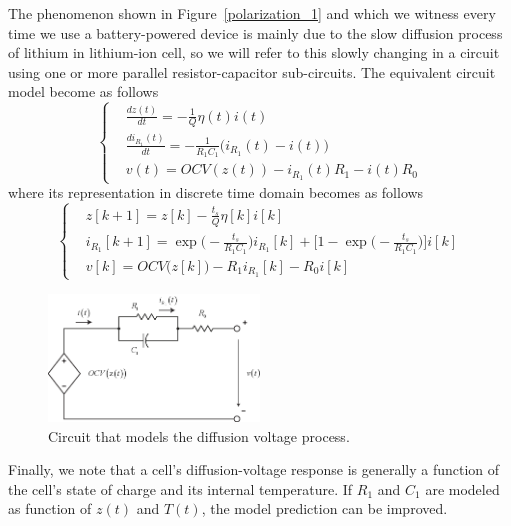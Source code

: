 \documentclass[11pt,a4paper]{article}
\numberwithin{equation}{section}
\theoremstyle{it}
\theoremstyle{definition}
\begin{document}
The phenomenon shown in Figure~\ref{polarization_1} and which we witness every time we use a battery-powered device is mainly due to the slow diffusion process of lithium in  lithium-ion cell, so we will refer to this slowly changing in a circuit using one or more parallel resistor-capacitor sub-circuits. The equivalent circuit model become as follows
\begin{equation}
	\left\lbrace \begin{aligned}
		&	\frac{dz(t)}{dt} = -\frac{1}{Q}\eta(t)i(t) \\[6pt]
		&	\frac{di_{R_1}(t)}{dt} = -\frac{1}{R_1C_1}\Big(i_{R_1}(t)-i(t)\Big) \\[6pt]
		&	v(t) = OCV(z(t)) - i_{R_1}(t)R_1 - i(t)R_0
	\end{aligned}\right. 
\end{equation}
where its representation in discrete time domain becomes as follows
\begin{equation}
	\left\lbrace \begin{aligned}
		&	z[k+1] =z[k] -\frac{t_s}{Q}\eta[k]i[k] \\[6pt]
		&	i_{R_1}[k+1] = \exp\Big(-\frac{t_s}{R_1C_1}\Big)i_{R_1}[k]+\Big[1-\exp\Big(-\frac{t_s}{R_1C_1}\Big)\Big]i[k] \\[6pt]
		&	v[k] = OCV\Big(z[k]\Big) -R_1i_{R_1}[k] - R_0i[k]
	\end{aligned}\right. 
\end{equation}
\begin{figure}[H]
	\centering
	\includegraphics[width = 0.5\textwidth, width = 275pt, angle = 0, keepaspectratio]{figures/lithium_ion_battery/cell_eq_circuit_3.eps}
	\captionsetup{width=0.5\textwidth}		
	\caption{Circuit that models the diffusion voltage process.}
	\label{ocv_soc_4}
\end{figure}
Finally, we note that a cell's diffusion-voltage response is generally a function of the cell's state of charge and its internal temperature. If $R_1$ and $C_1$ are modeled as function of $z(t)$ and $T(t)$, the model prediction can be improved.
\end{document}
